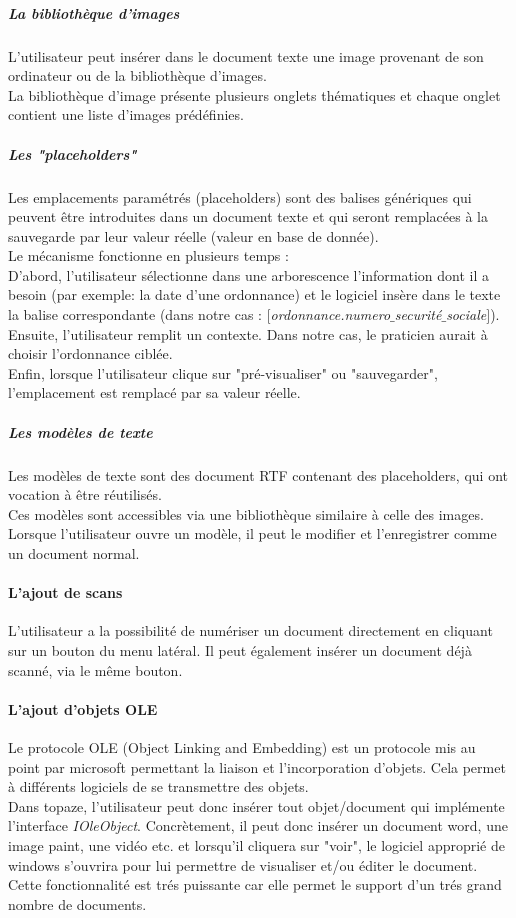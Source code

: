 \subparagraph*{La bibliothèque d'images}
L'utilisateur peut insérer dans le document texte une image provenant de son ordinateur ou de la bibliothèque d'images.\\
La bibliothèque d'image présente plusieurs onglets thématiques et chaque onglet contient une liste d'images prédéfinies.

\subparagraph*{Les "placeholders"}
Les emplacements paramétrés (placeholders) sont des balises génériques qui peuvent être introduites dans un document texte et qui seront remplacées à la sauvegarde par leur valeur réelle (valeur en base de donnée).\\

Le mécanisme fonctionne en plusieurs temps : \\
D'abord, l'utilisateur sélectionne dans une arborescence l'information dont il a besoin (par exemple: la date d'une ordonnance) et le logiciel insère dans le texte la balise correspondante (dans notre cas : \textit{$[$ordonnance.numero$\_$securité$\_$sociale$]$}). \\
Ensuite, l'utilisateur remplit un contexte. Dans notre cas, le praticien aurait à choisir l'ordonnance ciblée.\\
Enfin, lorsque l'utilisateur clique sur "pré-visualiser" ou "sauvegarder", l'emplacement est remplacé par sa valeur réelle.

\subparagraph*{Les modèles de texte}
Les modèles de texte sont des document RTF contenant des placeholders, qui ont vocation à être réutilisés.\\
Ces modèles sont accessibles via une bibliothèque similaire à celle des images. 
Lorsque l'utilisateur ouvre un modèle, il peut le modifier et l'enregistrer comme un document normal. 

\paragraph*{L'ajout de scans \\}
L'utilisateur a la possibilité de numériser un document directement en cliquant sur un bouton du menu latéral. Il peut également insérer un document déjà scanné, via le même bouton.

\paragraph*{L'ajout d'objets OLE\\}
Le protocole OLE (Object Linking and Embedding) est un protocole mis au point par microsoft permettant la liaison et l'incorporation d'objets. Cela permet à différents logiciels de se transmettre des objets. \\
Dans topaze, l'utilisateur peut donc insérer tout objet/document qui implémente l'interface \textit{IOleObject}. Concrètement, il peut donc insérer un document word, une image paint, une vidéo etc. et lorsqu'il cliquera sur "voir", le logiciel approprié de windows s'ouvrira pour lui permettre de visualiser et/ou éditer le document.
Cette fonctionnalité est trés puissante car elle permet le support d'un trés grand nombre de documents. 

